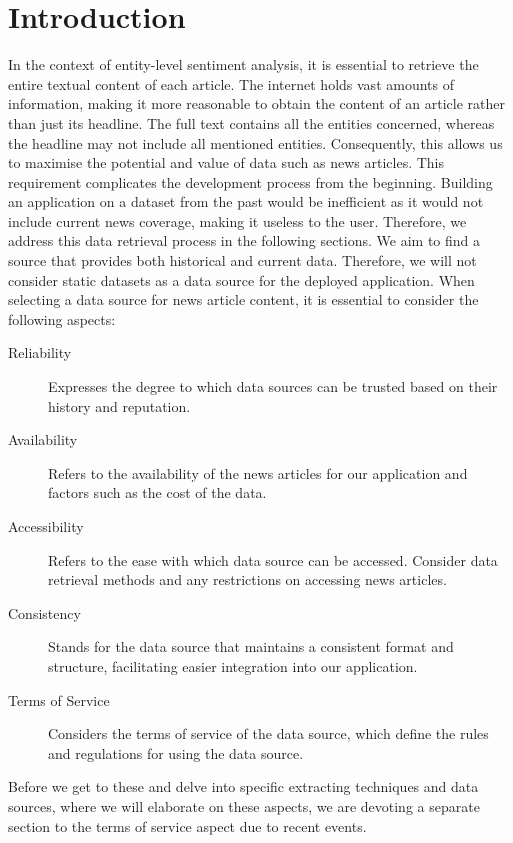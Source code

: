 \section{Introduction}
\label{chap:textual-data-introduction}
In the context of entity-level sentiment analysis, it is essential to retrieve the entire textual content of each article. The internet holds vast amounts of information, making it more reasonable to obtain the content of an article rather than just its headline. The full text contains all the entities concerned, whereas the headline may not include all mentioned entities. Consequently, this allows us to maximise the potential and value of data such as news articles. This requirement complicates the development process from the beginning. Building an application on a dataset from the past would be inefficient as it would not include current news coverage, making it useless to the user. Therefore, we address this data retrieval process in the following sections. We aim to find a source that provides both historical and current data. Therefore, we will not consider static datasets as a data source for the deployed application. When selecting a data source for news article content, it is essential to consider the following aspects:

\begin{description}
    \item[Reliability] Expresses the degree to which data sources can be trusted based on their history and reputation.
    \item[Availability] Refers to the availability of the news articles for our application and factors such as the cost of the data.
    \item[Accessibility] Refers to the ease with which data source can be accessed. Consider data retrieval methods and any restrictions on accessing news articles.
    \item[Consistency] Stands for the data source that maintains a consistent format and structure, facilitating easier integration into our application.
    \item[Terms of Service] Considers the terms of service of the data source, which define the rules and regulations for using the data source.
\end{description}

Before we get to these and delve into specific extracting techniques and data sources, where we will elaborate on these aspects, we are devoting a separate section to the terms of service aspect due to recent events.

